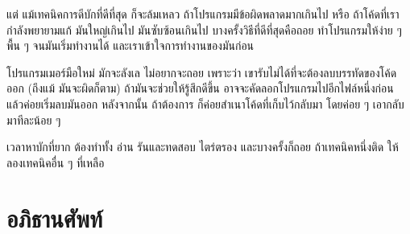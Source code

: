 
แต่ แม้เทคนิคการดีบักที่ดีที่สุด ก็จะล้มเหลว ถ้าโปรแกรมมีข้อผิดพลาดมากเกินไป
หรือ ถ้าโค้ดที่เรากำลังพยายามแก้ มันใหญ่เกินไป มันซับซ้อนเกินไป
บางครั้งวิธีที่ดีที่สุดคือถอย
ทำโปรแกรมให้ง่าย ๆ พื้น ๆ จนมันเริ่มทำงานได้ และเราเข้าใจการทำงานของมันก่อน


โปรแกรมเมอร์มือใหม่ มักจะลังเล ไม่อยากจะถอย 
เพราะว่า เขารับไม่ได้ที่จะต้องลบบรรทัดของโค้ดออก (ถึงแม้ มันจะผิดก็ตาม)
ถ้ามันจะช่วยให้รู้สึกดีขึ้น อาจจะคัดลอกโปรแกรมไปอีกไฟล์หนึ่งก่อน
แล้วค่อยเริ่มลบมันออก
หลังจากนั้น ถ้าต้องการ ก็ค่อยสำเนาโค้ดที่เก็บไว้กลับมา โดยค่อย ๆ เอากลับมาทีละน้อย ๆ


เวลาหาบักที่ยาก ต้องทำทั้ง อ่าน รันและทดสอบ ไตร่ตรอง
และบางครั้งก็ถอย
ถ้าเทคนิคหนึ่งติด ให้ลองเทคนิคอื่น ๆ ที่เหลือ

\section{อภิธานศัพท์}

